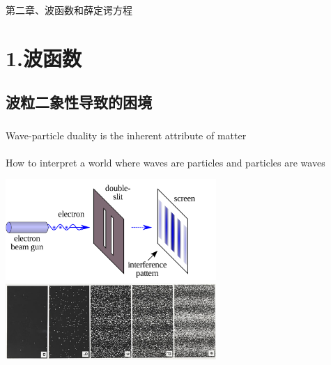 \begin{frame} [plain]
    \frametitle{}
    \Background[1] 
    \begin{center}
    { {\huge 第二章、波函数和薛定谔方程}}
    \end{center}  
    \addtocounter{framenumber}{-1}   
\end{frame}

\section{1.波函数}

\subsection{波粒二象性导致的困境}

\begin{frame}
    \frametitle{}
    \begin{tcolorbox4}[前情回顾]
        Wave-particle duality is the inherent attribute of matter\\
        ~~\\
        How to interpret a world where waves are particles and particles are waves
    \end{tcolorbox4}
\end{frame}

\begin{frame}
    \begin{center}
        \includegraphics[width=0.6\textwidth]{figs/Etwoslitexp.png} \\
        \includegraphics[width=0.6\textwidth]{figs/two-slit.png} \\
    \end{center} 
\end{frame}

